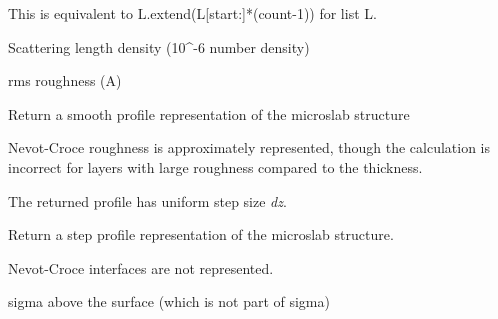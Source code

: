 \documentclass[letterpaper,10pt,english]{sphinxmanual}
\begin{document}
\begin{fulllineitems}
\begin{fulllineitems}
This is equivalent to L.extend(L{[}start:{]}*(count-1)) for list L.

\end{fulllineitems}


\begin{fulllineitems}
\label{api/profile:refl1d.profile.Microslabs.rho}
Scattering length density (10\textasciicircum{}-6 number density)

\end{fulllineitems}


\begin{fulllineitems}
\label{api/profile:refl1d.profile.Microslabs.sigma}
rms roughness (A)

\end{fulllineitems}


\begin{fulllineitems}
\label{api/profile:refl1d.profile.Microslabs.smooth_profile}
Return a smooth profile representation of the microslab structure

Nevot-Croce roughness is approximately represented, though the
calculation is incorrect for layers with large roughness compared
to the thickness.

The returned profile has uniform step size \emph{dz}.

\end{fulllineitems}


\begin{fulllineitems}
\label{api/profile:refl1d.profile.Microslabs.step_profile}
Return a step profile representation of the microslab structure.

Nevot-Croce interfaces are not represented.

\end{fulllineitems}


\begin{fulllineitems}
\label{api/profile:refl1d.profile.Microslabs.surface_sigma}
sigma above the surface (which is not part of sigma)


\end{fulllineitems}
\end{fulllineitems}
\end{document}

